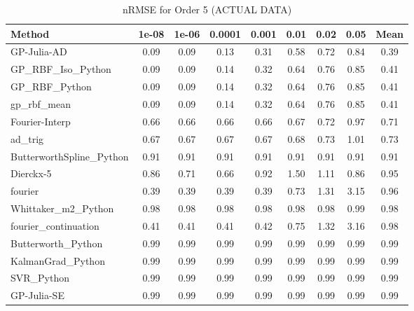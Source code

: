 \begin{table}[htbp]
\centering
\caption{nRMSE for Order 5 (ACTUAL DATA)}
\label{tab:order_5}
\tiny
\begin{tabular}{lcccccccc}
\toprule
\textbf{Method} & \textbf{1e-08} & \textbf{1e-06} & \textbf{0.0001} & \textbf{0.001} & \textbf{0.01} & \textbf{0.02} & \textbf{0.05} & \textbf{Mean} \\
\midrule
GP-Julia-AD & 0.09 & 0.09 & 0.13 & 0.31 & 0.58 & 0.72 & 0.84 & 0.39 \\
GP_RBF_Iso_Python & 0.09 & 0.09 & 0.14 & 0.32 & 0.64 & 0.76 & 0.85 & 0.41 \\
GP_RBF_Python & 0.09 & 0.09 & 0.14 & 0.32 & 0.64 & 0.76 & 0.85 & 0.41 \\
gp_rbf_mean & 0.09 & 0.09 & 0.14 & 0.32 & 0.64 & 0.76 & 0.85 & 0.41 \\
Fourier-Interp & 0.66 & 0.66 & 0.66 & 0.66 & 0.67 & 0.72 & 0.97 & 0.71 \\
ad_trig & 0.67 & 0.67 & 0.67 & 0.67 & 0.68 & 0.73 & 1.01 & 0.73 \\
ButterworthSpline_Python & 0.91 & 0.91 & 0.91 & 0.91 & 0.91 & 0.91 & 0.91 & 0.91 \\
Dierckx-5 & 0.86 & 0.71 & 0.66 & 0.92 & 1.50 & 1.11 & 0.86 & 0.95 \\
fourier & 0.39 & 0.39 & 0.39 & 0.39 & 0.73 & 1.31 & 3.15 & 0.96 \\
Whittaker_m2_Python & 0.98 & 0.98 & 0.98 & 0.98 & 0.98 & 0.98 & 0.99 & 0.98 \\
fourier_continuation & 0.41 & 0.41 & 0.41 & 0.42 & 0.75 & 1.32 & 3.16 & 0.98 \\
Butterworth_Python & 0.99 & 0.99 & 0.99 & 0.99 & 0.99 & 0.99 & 0.99 & 0.99 \\
KalmanGrad_Python & 0.99 & 0.99 & 0.99 & 0.99 & 0.99 & 0.99 & 0.99 & 0.99 \\
SVR_Python & 0.99 & 0.99 & 0.99 & 0.99 & 0.99 & 0.99 & 0.99 & 0.99 \\
GP-Julia-SE & 0.99 & 0.99 & 0.99 & 0.99 & 0.99 & 0.99 & 0.99 & 0.99 \\
\bottomrule
\end{tabular}
\end{table}
